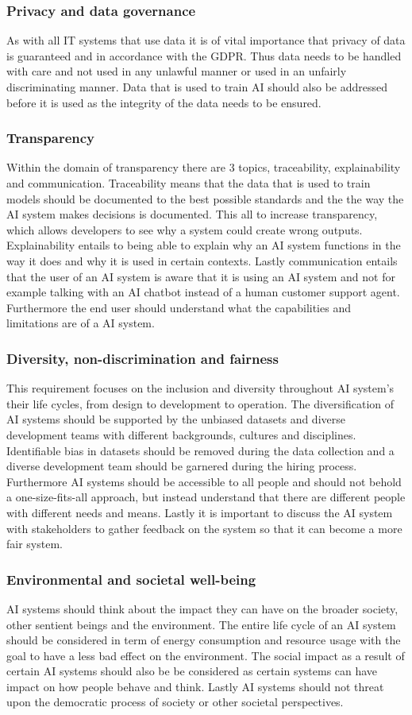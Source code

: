 \subsubsection*{Privacy and data governance}
As with all IT systems that use data it is of vital importance that privacy of data is guaranteed and in accordance with the GDPR. Thus data needs to be handled with care and not used in any unlawful manner or used in an unfairly discriminating manner. Data that is used to train AI should also be addressed before it is used as the integrity of the data needs to be ensured. 
\subsubsection*{Transparency}
Within the domain of transparency there are 3 topics, traceability, explainability and communication. Traceability means that the data that is used to train models should be documented to the best possible standards and the the way the AI system makes decisions is documented. This all to increase transparency, which allows developers to see why a system could create wrong outputs. Explainability entails to being able to explain why an AI system functions in the way it does and why it is used in certain contexts. Lastly communication entails that the user of an AI system is aware that it is using an AI system and not for example talking with an AI chatbot instead of a human customer support agent. Furthermore the end user should understand what the capabilities and limitations are of a AI system.
\subsubsection*{Diversity, non-discrimination and fairness}
This requirement focuses on the inclusion and diversity throughout AI system's their life cycles, from design to development to operation. The diversification of AI systems should be supported by the unbiased datasets and diverse development teams with different backgrounds, cultures and disciplines. Identifiable bias in datasets should be removed during the data collection and a diverse development team should be garnered during the hiring process. Furthermore AI systems should be accessible to all people and should not behold a one-size-fits-all approach, but instead understand that there are different people with different needs and means. Lastly it is important to discuss the AI system with stakeholders to gather feedback on the system so that it can become a more fair system.
\subsubsection*{Environmental and societal well-being}
AI systems should think about the impact they can have on the broader society, other sentient beings and the environment. The entire life cycle of an AI system should be considered in term of energy consumption and resource usage with the goal to have a less bad effect on the environment. The social impact as a result of certain AI systems should also be be considered as certain systems can have impact on how people behave and think. Lastly AI systems should not threat upon the democratic process of society or other societal perspectives.
